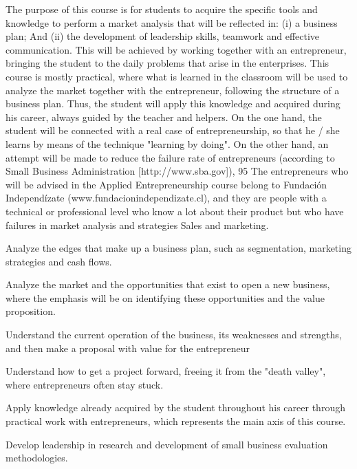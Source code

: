 \begin{syllabus}


\begin{justification}
The purpose of this course is for students to acquire the specific tools and knowledge to perform a market analysis that will be reflected in: (i) a business plan; And (ii) the development of leadership skills, teamwork and effective communication.
This will be achieved by working together with an entrepreneur, bringing the student to the daily problems that arise in the enterprises.
This course is mostly practical, where what is learned in the classroom will be used to analyze the market together with the entrepreneur, following the structure of a business plan. Thus, the student will apply this knowledge and acquired during his career, always guided by the teacher and helpers.
On the one hand, the student will be connected with a real case of entrepreneurship, so that he / she learns by means of the technique "learning by doing". On the other hand, an attempt will be made to reduce the failure rate of entrepreneurs (according to Small Business Administration [http://www.sba.gov]), 95%
The entrepreneurs who will be advised in the Applied Entrepreneurship course belong to Fundación Independízate (www.fundacionindependizate.cl), and they are people with a technical or professional level who know a lot about their product but who have failures in market analysis and strategies Sales and marketing.

\end{justification}

\begin{goals}
\item Analyze the edges that make up a business plan, such as segmentation, marketing strategies and cash flows.
\item Analyze the market and the opportunities that exist to open a new business, where the emphasis will be on identifying these opportunities and the value proposition.
\item Understand the current operation of the business, its weaknesses and strengths, and then make a proposal with value for the entrepreneur
\item Understand how to get a project forward, freeing it from the "death valley", where entrepreneurs often stay stuck.
\item Apply knowledge already acquired by the student throughout his career through practical work with entrepreneurs, which represents the main axis of this course.
\item Develop leadership in research and development of small business evaluation methodologies.
\end{goals}


\end{syllabus}
